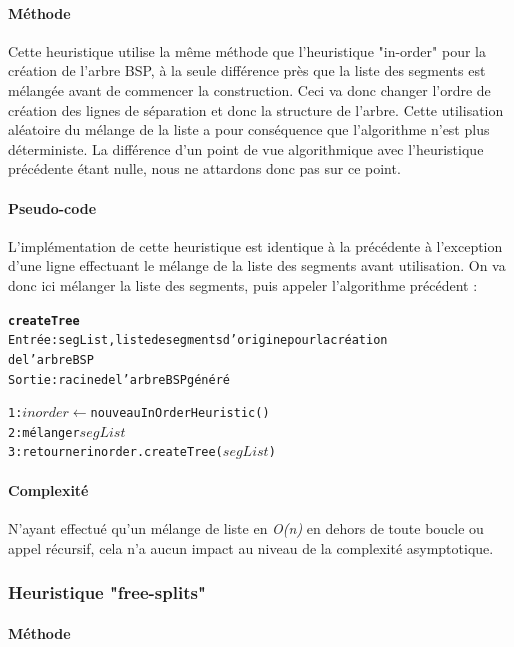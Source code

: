\documentclass[11pt,a4paper]{article}
\theoremstyle{definition}
\theoremstyle{remark}
\begin{document}
\paragraph{Méthode}

Cette heuristique utilise la même méthode que l'heuristique "in-order" pour la création de l'arbre BSP, à la seule différence près que la liste des segments est mélangée avant de commencer la construction. Ceci va donc changer l'ordre de création des lignes de séparation et donc la structure de l'arbre. Cette utilisation aléatoire du mélange de la liste a pour conséquence que l'algorithme n'est plus déterministe. La différence d'un point de vue algorithmique avec l'heuristique précédente étant nulle, nous ne attardons donc pas sur ce point. 

\paragraph{Pseudo-code}

L'implémentation de cette heuristique est identique à la précédente à l'exception d'une ligne effectuant le mélange de la liste des segments avant utilisation. On va donc ici mélanger la liste des segments, puis appeler l'algorithme précédent :

\begin{alltt}
\textbf{createTree}
Entrée : segList, liste de segments d'origine pour la création 
de l'arbre BSP
Sortie : racine de l'arbre BSP généré

1: \(inorder \leftarrow\) nouveau InOrderHeuristic()
2: mélanger \(segList\)
3: retourner inorder.createTree(\(segList\))
\end{alltt}

\paragraph{Complexité}

N'ayant effectué qu'un mélange de liste en \emph{O(n)} en dehors de toute boucle ou appel récursif, cela n'a aucun impact au niveau de la complexité asymptotique. 

\subsubsection{Heuristique "free-splits"}

\paragraph{Méthode}
\end{document}
